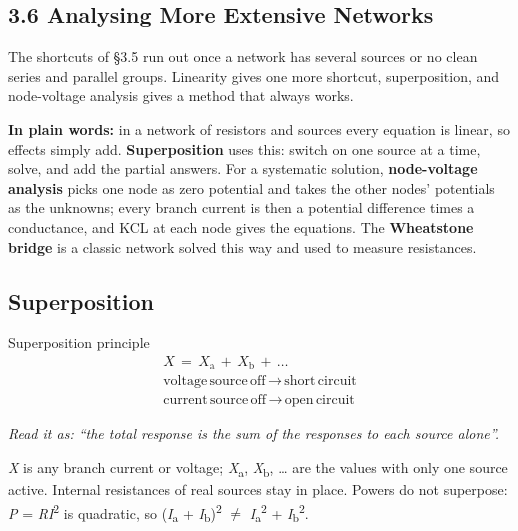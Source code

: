 \documentclass[11pt]{article}
\begin{document}
\begin{keepsection}
\section{3.6 Analysing More Extensive Networks}

The shortcuts of §3.5 run out once a network has several sources or no clean series and parallel groups. Linearity gives one more shortcut, superposition, and node-voltage analysis gives a method that always works.

\begin{plainbox}\textbf{In plain words:} in a network of resistors and sources every equation is linear, so effects simply add. \textbf{Superposition} uses this: switch on one source at a time, solve, and add the partial answers. For a systematic solution, \textbf{node-voltage analysis} picks one node as zero potential and takes the other nodes’ potentials as the unknowns; every branch current is then a potential difference times a conductance, and KCL at each node gives the equations. The \textbf{Wheatstone bridge} is a classic network solved this way and used to measure resistances.\end{plainbox}

\begin{keepsection}
\subsection{Superposition}

\begin{equationcard}{Superposition principle}
\[ \begin{gathered} {X}\, =\, {X}_{\mathrm{a}}\, +\, {X}_{\mathrm{b}}\, +\, … \\ \text{voltage}\, \text{source}\, \text{off}\, \to \, \text{short}\, \text{circuit} \\ \text{current}\, \text{source}\, \text{off}\, \to \, \text{open}\, \text{circuit} \end{gathered} \]
{\small \emph{Read it as: “the total response is the sum of the responses to each source alone”.}\par \textit{X} is any branch current or voltage; \textit{X}\textsubscript{a}, \textit{X}\textsubscript{b}, … are the values with only one source active. Internal resistances of real sources stay in place. Powers do not superpose: \textit{P} = \textit{R}\textit{I}\textsuperscript{2} is quadratic, so (\textit{I}\textsubscript{a} + \textit{I}\textsubscript{b})\textsuperscript{2} \ensuremath{\neq} \textit{I}\textsubscript{a}\textsuperscript{2} + \textit{I}\textsubscript{b}\textsuperscript{2}.}
\end{equationcard}


\end{keepsection}
\end{keepsection}
\end{document}
